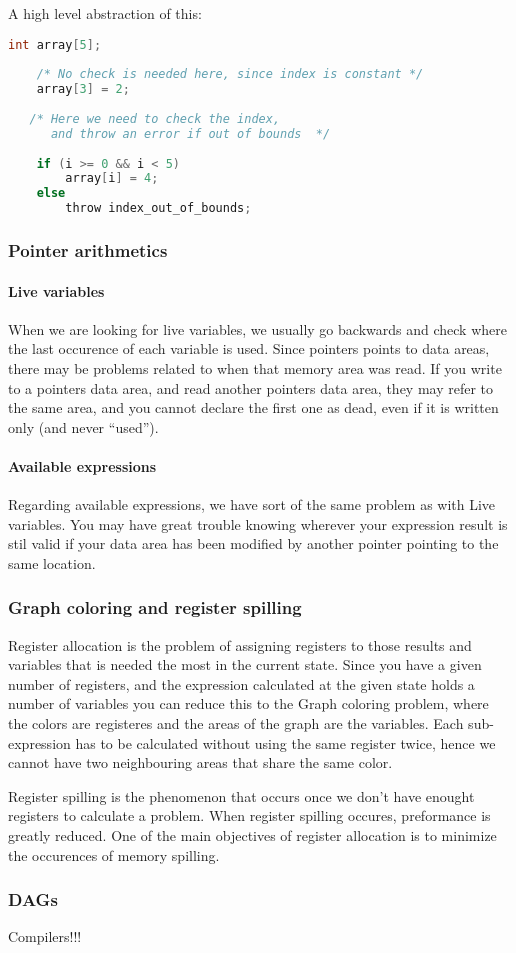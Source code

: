 \documentclass[english,a4paper]{scrartcl}
\begin{document}
A high level abstraction of this:
\begin{lstlisting}[language=C]
    int array[5];
    
    /* No check is needed here, since index is constant */
    array[3] = 2;
    
   /* Here we need to check the index,
      and throw an error if out of bounds  */
   
    if (i >= 0 && i < 5)
        array[i] = 4;
    else
        throw index_out_of_bounds;
\end{lstlisting}

\subsubsection{Pointer arithmetics}
\paragraph{Live variables}
When we are looking for live variables, we usually go backwards and check where
the last occurence of each variable is used. Since pointers points to data
areas, there may be problems related to when that memory area was read. If you
write to a pointers data area, and read another pointers data area, they may
refer to the same area, and you cannot declare the first one as dead, even if
it is written only (and never ``used'').
\paragraph{Available expressions}
Regarding available expressions, we have sort of the same problem as with Live
variables. You may have great trouble knowing wherever your expression result is
stil valid if your data area has been modified by another pointer pointing to
the same location.

\subsubsection{Graph coloring and register spilling}
Register allocation is the problem of assigning registers to those results and
variables that is needed the most in the current state. Since you have a given
number of registers, and the expression calculated at the given state holds a
number of variables you can reduce this to the Graph coloring problem, where the
colors are registeres and the areas of the graph are the variables. Each
sub-expression has to be calculated without using the same register twice, hence
we cannot have two neighbouring areas that share the same color.

Register spilling is the phenomenon that occurs once we don't have enought
registers to calculate a problem. When register spilling occures, preformance
is greatly reduced. One of the main objectives of register allocation is to
minimize the occurences of memory spilling. 

\subsubsection{DAGs}
Compilers!!!
\end{document}

